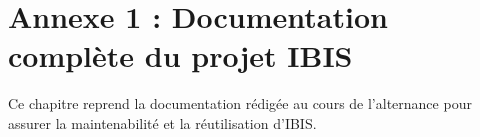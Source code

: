 \chapter*{Annexe 1 : Documentation complète du projet IBIS}\label{ch:ibisdoc}
\setcounter{chapter}{1}

\begin{bluebox}
    Ce chapitre reprend la documentation rédigée au cours de l'alternance pour assurer la maintenabilité et la réutilisation d'\gls{IBIS}.
\end{bluebox}